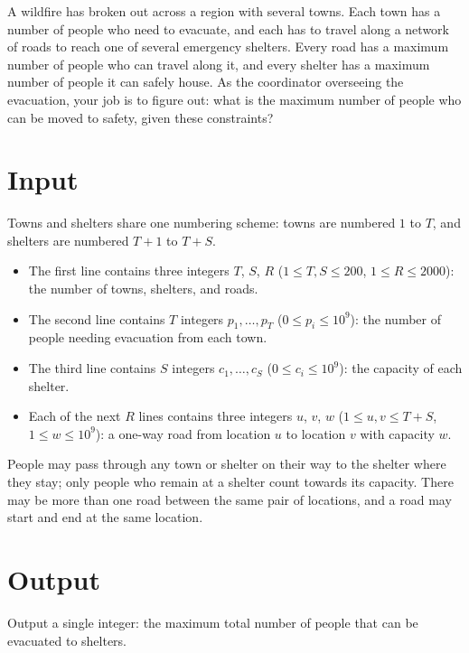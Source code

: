 
A wildfire has broken out across a region with several towns. Each town has a
number of people who need to evacuate, and each has to travel along a network
of roads to reach one of several emergency shelters. Every road has a maximum 
number of people who can travel along it, and every shelter has a maximum number 
of people it can safely house. As the coordinator overseeing the evacuation, your 
job is to figure out: what is the maximum number of people who can be moved to 
safety, given these constraints?

\section*{Input}
Towns and shelters share one numbering scheme: towns are numbered
$1$ to $T$, and shelters are numbered $T{+}1$ to $T{+}S$.

\begin{itemize}
\item The first line contains three integers $T$, $S$, $R$
  ($1 \le T, S \le 200$, $1 \le R \le 2000$): the number of towns,
  shelters, and roads.
\item The second line contains $T$ integers $p_1, \dots, p_T$
  ($0 \le p_i \le 10^9$): the number of people needing evacuation
  from each town.
\item The third line contains $S$ integers $c_1, \dots, c_S$
  ($0 \le c_i \le 10^9$): the capacity of each shelter.
\item Each of the next $R$ lines contains three integers $u$, $v$, $w$
  ($1 \le u, v \le T+S$, $1 \le w \le 10^9$): a one-way road from
  location $u$ to location $v$ with capacity $w$.
\end{itemize}

People may pass through any town or shelter on their way to the shelter
where they stay; only people who remain at a shelter count towards its
capacity. There may be more than one road between the same pair of
locations, and a road may start and end at the same location.

\section*{Output}
Output a single integer: the maximum total number of people that can be
evacuated to shelters.